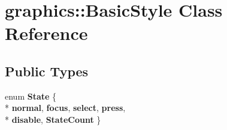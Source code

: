 \hypertarget{classgraphics_1_1_basic_style}{\section{graphics\-:\-:Basic\-Style Class Reference}
\label{classgraphics_1_1_basic_style}
}
\subsection*{Public Types}
\begin{DoxyCompactItemize}
\item 
enum {\bfseries State} \{ \\*
{\bfseries normal}, 
{\bfseries focus}, 
{\bfseries select}, 
{\bfseries press}, 
\\*
{\bfseries disable}, 
{\bfseries State\-Count}
 \}
\end{DoxyCompactItemize}

